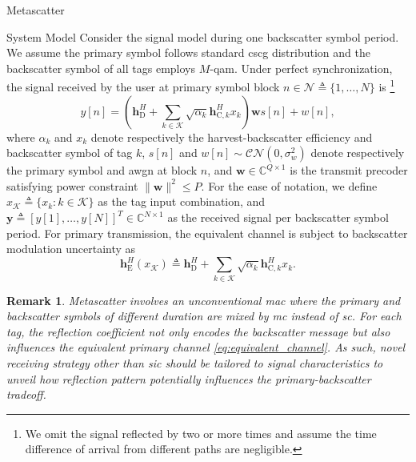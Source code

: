 \documentclass[journal]{IEEEtran}
\newtheorem{remark}{Remark}
\begin{document}
\begin{section}{Metascatter}
\begin{subsection}{System Model}
		Consider the signal model during one backscatter symbol period.
		We assume the primary symbol follows standard \gls{cscg} distribution and the backscatter symbol of all tags employs $M$-\gls{qam}.
		Under perfect synchronization, the signal received by the user at primary symbol block $n \in \mathcal{N} \triangleq \{1,\ldots,N\}$ is
		\footnote{
			We omit the signal reflected by two or more times\cite{Wu2019} and assume the time difference of arrival from different paths are negligible\cite{Guo2019b}.
		}
		\begin{equation}
			y[n] = \left(\boldsymbol{h}_{\mathrm{D}}^H + \sum_{k \in \mathcal{K}} \sqrt{\alpha_k} \boldsymbol{h}_{\mathrm{C},k}^H x_k\right) \boldsymbol{w} s[n] + w[n],
			\label{eq:received_signal}
		\end{equation}
		where $\alpha_k$ and $x_k$ denote respectively the harvest-backscatter efficiency and backscatter symbol of tag $k$, $s[n]$ and $w[n] \sim \mathcal{CN}(0,\sigma_w^2)$ denote respectively the primary symbol and \gls{awgn} at block $n$, and $\boldsymbol{w} \in \mathbb{C}^{Q \times 1}$ is the transmit precoder satisfying power constraint $\lVert \boldsymbol{w} \rVert^2 \le P$.
		For the ease of notation, we define $x_{\mathcal{K}} \triangleq \{x_k : k \in \mathcal{K}\}$ as the tag input combination, and $\boldsymbol{y} \triangleq \left[y[1],\ldots,y[N]\right]^T \in \mathbb{C}^{N \times 1}$ as the received signal per backscatter symbol period.
		For primary transmission, the equivalent channel is subject to backscatter modulation uncertainty as
		\begin{equation}
			\boldsymbol{h}_{\mathrm{E}}^H(x_{\mathcal{K}}) \triangleq \boldsymbol{h}_{\mathrm{D}}^H + \sum_{k \in \mathcal{K}} \sqrt{\alpha_k} \boldsymbol{h}_{\mathrm{C},k}^H x_k.
			\label{eq:equivalent_channel}
		\end{equation}

		\begin{remark}
			Metascatter involves an unconventional \gls{mac} where the primary and backscatter symbols of different duration are mixed by \gls{mc} instead of \gls{sc}.
			For each tag, the reflection coefficient not only encodes the backscatter message but also influences the equivalent primary channel \eqref{eq:equivalent_channel}.
			As such, novel receiving strategy other than \gls{sic} should be tailored to signal characteristics to unveil how reflection pattern potentially influences the primary-backscatter tradeoff.
		\end{remark}
	\end{subsection}


\end{section}
\end{document}
